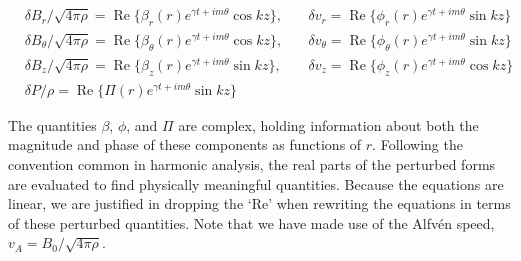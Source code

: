 \documentclass[letterpaper]{article}
\begin{document}
\begin{align}
&\delta B_r / \sqrt{4\pi\rho} = \operatorname{Re}\{\beta_r (r)
 e^{\gamma t + im\theta}\cos{kz}\},\quad
&\delta v_r = \operatorname{Re}\{\phi_r (r)
 e^{\gamma t + im\theta} \sin{kz}\}
\nonumber \\
&\delta B_\theta / \sqrt{4\pi\rho} = \operatorname{Re}\{\beta_\theta (r)
 e^{\gamma t + im\theta} \cos{kz}\},\quad
&\delta v_\theta = \operatorname{Re}\{\phi_\theta (r)
 e^{\gamma t + im\theta} \sin{kz}\}
\nonumber \\
&\delta B_z / \sqrt{4\pi\rho} = \operatorname{Re}\{\beta_z (r)
 e^{\gamma t + im\theta} \sin{kz}\},\quad
&\delta v_z = \operatorname{Re}\{\phi_z (r) e^{\gamma t+im\theta}\cos{kz}\}
\nonumber \\
&\delta P/ \rho = \operatorname{Re}\{\Pi (r)
 e^{\gamma t + im\theta} \sin{kz}\}&
\end{align}

The quantities $\beta$, $\phi$, and $\Pi$ are complex, holding
information about both the magnitude and phase of these components as
functions of $r$. Following the convention common in harmonic
analysis, the real parts of the perturbed forms are evaluated to find
physically meaningful quantities. Because the equations are linear, we
are justified in dropping the `$\mathrm{Re}$' when rewriting the
equations in terms of these perturbed quantities. Note that we have
made use of the Alfv\'{e}n speed, $v_A = B_0/\sqrt{4\pi\rho}$.
\end{document}
